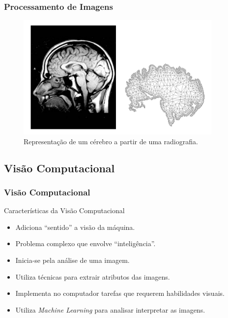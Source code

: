 \documentclass{beamer}
\begin{document}


\begin{frame}
\frametitle{Processamento de Imagens}
	
	\begin{figure}[!h]
		\begin{center}
			\includegraphics[width=0.9\textwidth]{Figures/cerebro}
			\caption{Representação de um cérebro a partir de uma radiografia.}
		\end{center}
		
	\end{figure}
	
\end{frame}


\subsection{Visão Computacional}

\begin{frame}
\frametitle{Visão Computacional}
	\begin{block}{Características da Visão Computacional}
	
		\begin{itemize}
			\item<1-> Adiciona ``sentido'' a visão da máquina.
			\item<2-> Problema complexo que envolve ``inteligência''.
			\item<3-> Inicia-se pela análise de uma imagem. 
			\item<4-> Utiliza técnicas para extrair atributos das imagens.
			\item<5-> Implementa no computador tarefas que requerem habilidades visuais. 
			\item<6-> Utiliza \textit{Machine Learning} para analisar interpretar as imagens.
		\end{itemize}
	\end{block}
\end{frame}
\end{document}
